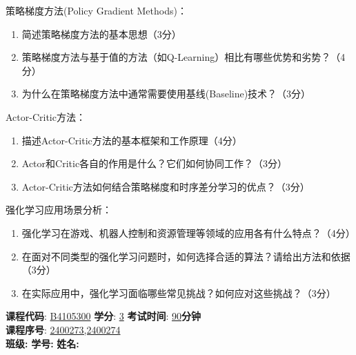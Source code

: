 \documentclass[zihao=5,noanswers]{BHCexam}
\begin{document}
\begin{questions}
\question[10] 策略梯度方法(Policy Gradient Methods)：
\begin{enumerate}
    \item 简述策略梯度方法的基本思想（3分）
    \item 策略梯度方法与基于值的方法（如Q-Learning）相比有哪些优势和劣势？（4分）
    \item 为什么在策略梯度方法中通常需要使用基线(Baseline)技术？（3分）
\end{enumerate}

\question[10] Actor-Critic方法：
\begin{enumerate}
    \item 描述Actor-Critic方法的基本框架和工作原理（4分）
    \item Actor和Critic各自的作用是什么？它们如何协同工作？（3分）
    \item Actor-Critic方法如何结合策略梯度和时序差分学习的优点？（3分）
\end{enumerate}

\question[10] 强化学习应用场景分析：
\begin{enumerate}
    \item 强化学习在游戏、机器人控制和资源管理等领域的应用各有什么特点？（4分）
    \item 在面对不同类型的强化学习问题时，如何选择合适的算法？请给出方法和依据（3分）
    \item 在实际应用中，强化学习面临哪些常见挑战？如何应对这些挑战？（3分）
\end{enumerate}

\end{questions}



\ifprintanswers
\else
\newpage
{}
\maketitle


\begin{flushleft}
 \qquad\kaishu \textbf{课程代码}: \underline{\hspace{2ex}B4105300\hspace{2ex}} \quad\kaishu \textbf{学分}: \underline{\hspace{5ex}3\hspace{5ex}} \quad \kaishu \textbf{考试时间}: \underline{\hspace{3ex}90\hspace{3ex}}\kaishu \textbf{分钟}\\
 \qquad\kaishu \textbf{课程序号}: \underline{\hspace{25ex}2400273,2400274\hspace{25ex}}\\
 \qquad\vspace{1ex}
 \kaishu \textbf{班级:} \underline{\hspace{15ex}} \quad
 \kaishu \textbf{学号:} \underline{\hspace{15ex}} \quad
 \kaishu \textbf{姓名:} \underline{\hspace{15ex}} \quad
\end{flushleft}
\end{document}
